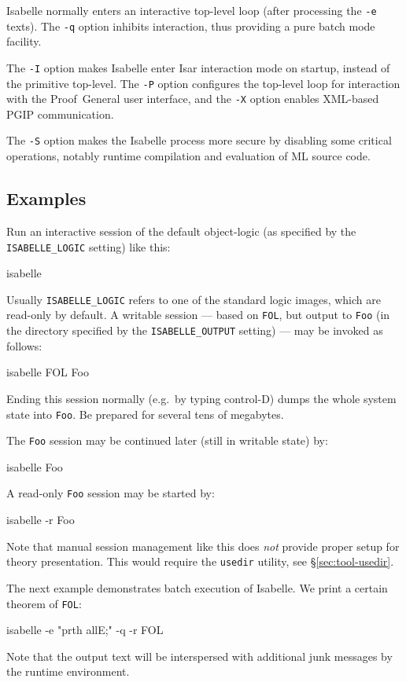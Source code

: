 \medskip Isabelle normally enters an interactive top-level loop (after
processing the \texttt{-e} texts). The \texttt{-q} option inhibits
interaction, thus providing a pure batch mode facility.

\medskip The \texttt{-I} option makes Isabelle enter Isar interaction
mode on startup, instead of the primitive {\ML} top-level.  The
\texttt{-P} option configures the top-level loop for interaction with
the Proof~General user interface, and the \texttt{-X} option enables
XML-based PGIP communication.

\medskip The \texttt{-S} option makes the Isabelle process more secure
by disabling some critical operations, notably runtime compilation and
evaluation of ML source code.


\subsection*{Examples}

Run an interactive session of the default object-logic (as specified
by the \texttt{ISABELLE_LOGIC} setting) like this:
\begin{ttbox}
isabelle
\end{ttbox}
Usually \texttt{ISABELLE_LOGIC} refers to one of the standard logic
images, which are read-only by default.  A writable session --- based
on \texttt{FOL}, but output to \texttt{Foo} (in the directory
specified by the \texttt{ISABELLE_OUTPUT} setting) --- may be invoked
as follows:
\begin{ttbox}
isabelle FOL Foo
\end{ttbox}
Ending this session normally (e.g.\ by typing control-D) dumps the whole {\ML}
system state into \texttt{Foo}. Be prepared for several tens of megabytes.

The \texttt{Foo} session may be continued later (still in writable
state) by:
\begin{ttbox}
isabelle Foo
\end{ttbox}
A read-only \texttt{Foo} session may be started by:
\begin{ttbox}
isabelle -r Foo
\end{ttbox}

\medskip Note that manual session management like this does \emph{not} provide
proper setup for theory presentation.  This would require the \texttt{usedir}
utility, see \S\ref{sec:tool-usedir}.

\bigskip The next example demonstrates batch execution of Isabelle. We print a
certain theorem of \texttt{FOL}:
\begin{ttbox}
isabelle -e "prth allE;" -q -r FOL
\end{ttbox}
Note that the output text will be interspersed with additional junk messages
by the {\ML} runtime environment.


